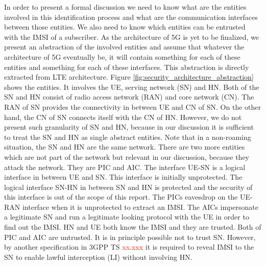 \documentclass[lnicst,sechang,a4paper]{svmultln}
\begin{document}
In order to present a formal discussion we need to know what are the entities involved in this identification process and what are the communication interfaces between those entities. We also need to know which entities can be entrusted with the IMSI of a subscriber. As the architecture of 5G is yet to be finalized, we present an abstraction of the involved entities and assume that whatever the architecture of 5G eventually be, it will contain something for each of these entities and something for each of these interfaces. This abstraction is directly extracted from LTE architecture. Figure \ref{fig:security_architecture_abstraction} shows the entities. It involves the UE, serving network (SN) and HN. Both of the SN and HN consist of radio access network (RAN) and core network (CN). The RAN of SN provides the connectivity in between UE and CN of SN. On the other hand, the CN of SN connects itself with the CN of HN. However, we do not present such granularity of SN and HN, because in our discussion it is sufficient to treat the SN and HN as single abstract entities. Note that in a non-roaming situation, the SN and HN are the same network. There are two more entities which are not part of the network but relevant in our discussion, because they attack the network. They are PIC and AIC. The interface UE-SN is a logical interface in between UE and SN. This interface is initially unprotected. The logical interface SN-HN in between SN and HN is protected and the security of this interface is out of the scope of this report. The PICs eavesdrop on the UE-RAN interface when it is unprotected to extract an IMSI. The AICs impersonate a legitimate SN and run a legitimate looking protocol with the UE in order to find out the IMSI. HN and UE both know the IMSI and they are trusted. Both of PIC and AIC are untrusted. It is in principle possible not to trust SN. However, by another specification in 3GPP TS \textcolor{red}{xx.xxx} it is required to reveal IMSI to the SN to enable lawful interception (LI) without involving HN.
\end{document}

